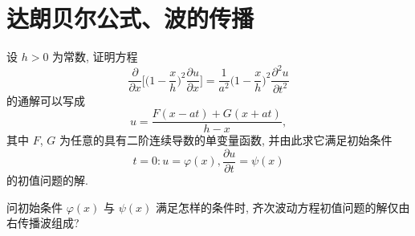 

\section{达朗贝尔公式、波的传播}

\begin{exercise}
  设 $h>0$ 为常数, 证明方程
  \[\frac{\partial}{\partial x}\biggl[\biggl(1-\frac{x}{h}\biggr)^2
    \frac{\partial u}{\partial x}\biggr]
    = \frac{1}{a^2}\biggl(1-\frac{x}{h}\biggr)^2 \frac{\partial^2u}{\partial t^2}\]
  的通解可以写成
  \[u = \frac{F(x-at)+G(x+at)}{h-x},\]
  其中 $F$, $G$ 为任意的具有二阶连续导数的单变量函数, 并由此求它满足初始条件
  \[t=0: u = \varphi(x), \frac{\partial u}{\partial t} = \psi(x)\]
  的初值问题的解.
\end{exercise}



\begin{exercise}
  问初始条件 $\varphi(x)$ 与 $\psi(x)$ 满足怎样的条件时,
  齐次波动方程初值问题的解仅由右传播波组成?
\end{exercise}



